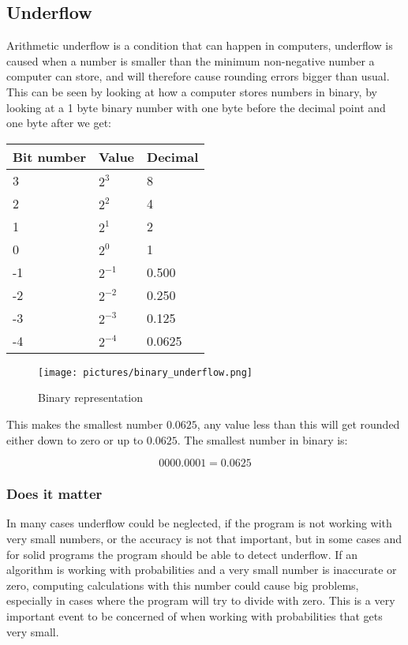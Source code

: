 \subsection{Underflow}
    Arithmetic underflow is a condition that can happen in computers, underflow is caused when a number is smaller than the minimum non-negative number a computer can store, and will therefore cause rounding errors bigger than usual. This can be seen by looking at how a computer stores numbers in binary, by looking at a 1 byte binary number with one byte before the decimal point and one byte after we get:\\

\begin{table}[!h]
    \begin{tabular}{|l|l|l|}
        \hline
        Bit number & Value    & Decimal \\ \hline
        3          & $2^3$    & 8       \\ 
        2          & $2^2$    & 4       \\ 
        1          & $2^1$    & 2       \\ 
        0          & $2^0$    & 1       \\ 
        -1         & $2^{-1}$ & 0.500   \\ 
        -2         & $2^{-2}$ & 0.250   \\ 
        -3         & $2^{-3}$ & 0.125   \\ 
        -4         & $2^{-4}$ & 0.0625  \\
        \hline
    \end{tabular}
\end{table}

	\begin{figure}
		\centering
		\texttt{[image: pictures/binary\_underflow.png]}
		\caption{Binary representation}
		\label{fig:binary_underflow}
	\end{figure}


    This makes the smallest number $0.0625$, any value less than this will get rounded either down to zero or up to $0.0625$. The smallest number in binary is:

    $$0000.0001 = 0.0625$$

\subsubsection{Does it matter}
In many cases underflow could be neglected, if the program is not working with very small numbers, or the accuracy is not that important, but in some cases and for solid programs the program should be able to detect underflow. If an algorithm is working with probabilities and a very small number is inaccurate or zero, computing calculations with this number could cause big problems, especially in cases where the program will try to divide with zero. This is a very important event to be concerned of when working with probabilities that gets very small.  

